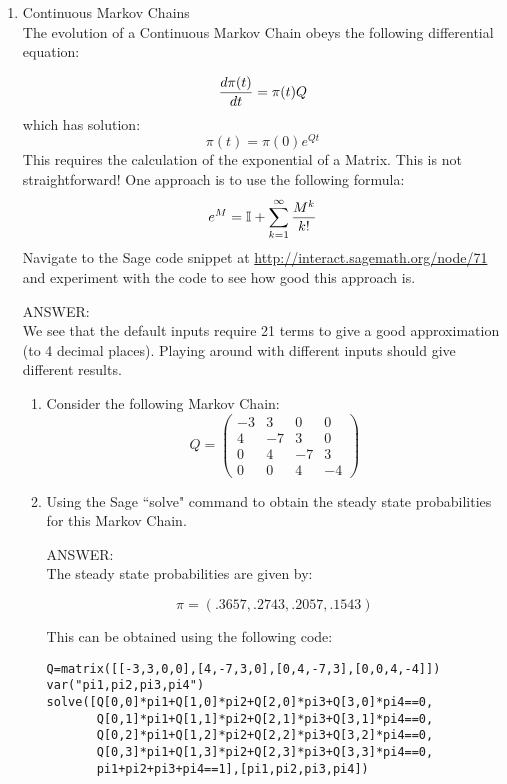 \documentclass[12pt]{article}
\begin{document}
\begin{enumerate}
\begin{enumerate}
\end{enumerate}
\item Continuous Markov Chains\\
The evolution of a Continuous Markov Chain obeys the following differential equation:

$${d\pi(t)\over dt}=\pi(t)Q$$
which has solution:
$$\pi(t)=\pi(0)e^{Qt}$$
This requires the calculation of the exponential of a Matrix. This is not straightforward! One approach is to use the following formula:
$$
e^{M}=\mathbb{I}+\sum_{k=1}^{\infty}{M^k\over k!}
$$
Navigate to the Sage code snippet at \url{http://interact.sagemath.org/node/71} and experiment with the code to see how good this approach is.

ANSWER:\\
We see that the default inputs require 21 terms to give a good approximation (to 4 decimal places). Playing around with different inputs should give different results.

\begin{enumerate}
\item Consider the following Markov Chain:
$$Q=\begin{pmatrix}
-3&3&0&0\\
4&-7&3&0\\
0&4&-7&3\\
0&0&4&-4
\end{pmatrix}$$
\item Using the Sage ``solve" command to obtain the steady state probabilities for this Markov Chain.

ANSWER:\\
The steady state probabilities are given by:

$$\pi=(.3657,.2743,.2057,.1543)$$

This can be obtained using the following code:

\begin{verbatim}
Q=matrix([[-3,3,0,0],[4,-7,3,0],[0,4,-7,3],[0,0,4,-4]])
var("pi1,pi2,pi3,pi4")
solve([Q[0,0]*pi1+Q[1,0]*pi2+Q[2,0]*pi3+Q[3,0]*pi4==0,
       Q[0,1]*pi1+Q[1,1]*pi2+Q[2,1]*pi3+Q[3,1]*pi4==0,
       Q[0,2]*pi1+Q[1,2]*pi2+Q[2,2]*pi3+Q[3,2]*pi4==0,
       Q[0,3]*pi1+Q[1,3]*pi2+Q[2,3]*pi3+Q[3,3]*pi4==0,
       pi1+pi2+pi3+pi4==1],[pi1,pi2,pi3,pi4])
\end{verbatim}
\end{enumerate}
\end{enumerate}
\end{document}
